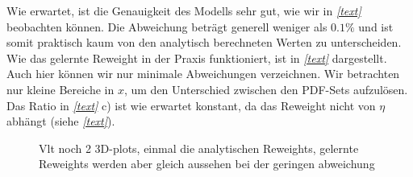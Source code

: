 Wie erwartet, ist die Genauigkeit des Modells sehr gut, wie wir in \textit{\autoref{text}} beobachten können. Die Abweichung beträgt generell weniger als $0.1\%$ und ist somit praktisch kaum von den analytisch berechneten Werten zu unterscheiden. Wie das gelernte Reweight in der Praxis funktioniert, ist in \textit{\autoref{text}} dargestellt. Auch hier können wir nur minimale Abweichungen verzeichnen. Wir betrachten nur kleine Bereiche in $x$, um den Unterschied zwischen den PDF-Sets aufzulösen. Das Ratio in \textit{\autoref{text}} c) ist wie erwartet konstant, da das Reweight nicht von $\eta$ abhängt (siehe \textit{\autoref{text}}). 
\begin{figure}[tbp]
	\centering
	\caption{Vlt noch 2 3D-plots, einmal die analytischen Reweights, gelernte Reweights werden aber gleich aussehen bei der geringen abweichung}
	\label{32,33}
\end{figure}
